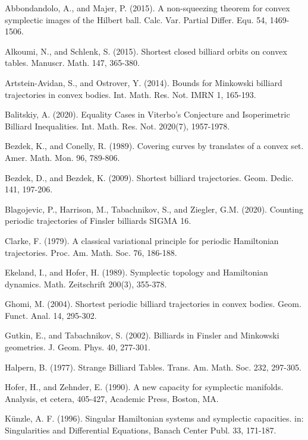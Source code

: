 \documentclass[12pt]{amsart}
\theoremstyle{plain}
\theoremstyle{remark}
\theoremstyle{definition}
\begin{document}
\begin{thebibliography}{}

Abbondandolo, A., and Majer, P. (2015). A non-squeezing theorem for convex symplectic images of the Hilbert ball. Calc. Var. Partial Differ. Equ. 54, 1469-1506.

Alkoumi, N., and Schlenk, S. (2015). Shortest closed billiard orbits on convex tables. Manuscr. Math. 147, 365-380.

Artstein-Avidan, S., and Ostrover, Y. (2014). Bounds for Minkowski billiard trajectories in convex bodies. Int. Math. Res. Not. IMRN 1, 165-193.

Balitskiy, A. (2020). Equality Cases in Viterbo's Conjecture and Isoperimetric Billiard Inequalities. Int. Math. Res. Not. 2020(7), 1957-1978.

Bezdek, K., and Conelly, R. (1989). Covering curves by translates of a convex set. Amer. Math. Mon. 96, 789-806.

Bezdek, D., and Bezdek, K. (2009). Shortest billiard trajectories. Geom. Dedic. 141, 197-206.

Blagojevic, P., Harrison, M., Tabachnikov, S., and Ziegler, G.M. (2020). Counting periodic trajectories of Finsler billiards SIGMA 16.

Clarke, F. (1979). A classical variational principle for periodic Hamiltonian trajectories. Proc. Am. Math. Soc. 76, 186-188.

Ekeland, I., and Hofer, H. (1989). Symplectic topology and Hamiltonian dynamics. Math. Zeitschrift 200(3), 355-378.

Ghomi, M. (2004). Shortest periodic billiard trajectories in convex bodies. Geom. Funct. Anal. 14, 295-302.

Gutkin, E., and Tabachnikov, S. (2002). Billiards in Finsler and Minkowski geometries. J. Geom. Phys. 40, 277-301.

Halpern, B. (1977). Strange Billiard Tables. Trans. Am. Math. Soc. 232, 297-305.

Hofer, H., and Zehnder, E. (1990). A new capacity for symplectic manifolds. Analysis, et cetera, 405-427, Academic Press, Boston, MA.

K\"{u}nzle, A. F. (1996). Singular Hamiltonian systems and symplectic capacities. in: Singularities and Differential Equations, Banach Center Publ. 33, 171-187.


\end{thebibliography}
\end{document}
